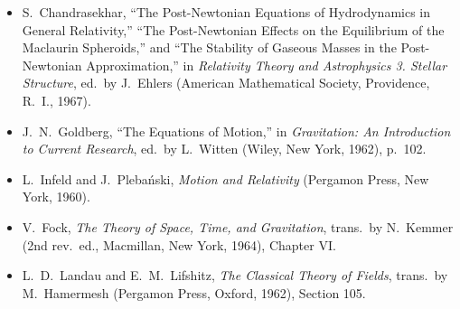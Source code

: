 

\begin{itemize}
  \item[\(\square\)] S.~Chandrasekhar, ``The Post-Newtonian Equations of
  Hydrodynamics in General Relativity,'' ``The Post-Newtonian Effects on the
  Equilibrium of the Maclaurin Spheroids,'' and ``The Stability of Gaseous
  Masses in the Post-Newtonian Approximation,'' in \emph{Relativity Theory
  and Astrophysics 3. Stellar Structure}, ed.\ by J.~Ehlers (American
  Mathematical Society, Providence, R.~I., 1967).

  \item[\(\square\)] J.~N.~Goldberg, ``The Equations of Motion,'' in
  \emph{Gravitation: An Introduction to Current Research}, ed.\ by L.~Witten
  (Wiley, New York, 1962), p.~102.

  \item[\(\square\)] L.~Infeld and J.~Pleba\'nski, \emph{Motion and
  Relativity} (Pergamon Press, New York, 1960).

  \item[\(\square\)] V.~Fock, \emph{The Theory of Space, Time, and
  Gravitation}, trans.\ by N.~Kemmer (2nd rev.\ ed., Macmillan, New York,
  1964), Chapter VI.

  \item[\(\square\)] L.~D.~Landau and E.~M.~Lifshitz, \emph{The Classical
  Theory of Fields}, trans.\ by M.~Hamermesh (Pergamon Press, Oxford, 1962),
  Section 105.
\end{itemize}


